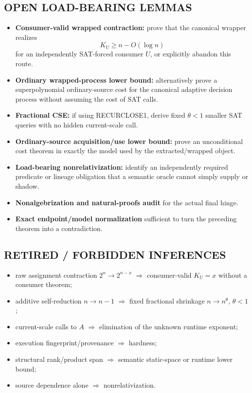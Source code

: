 \documentclass[11pt]{article}
\theoremstyle{plain}
\theoremstyle{definition}
\theoremstyle{remark}
\begin{document}
\subsection*{OPEN LOAD-BEARING LEMMAS}
\begin{itemize}
\item \textbf{Consumer-valid wrapped contraction:} prove that the canonical
wrapper realizes
\[
K_U\ge n-O(\log n)
\]
for an independently SAT-forced consumer \(U\), or explicitly abandon this
route.
\item \textbf{Ordinary wrapped-process lower bound:} alternatively prove a
superpolynomial ordinary-source cost for the canonical adaptive decision
process without assuming the cost of SAT calls.
\item \textbf{Fractional CSE:} if using RECURCLOSE1, derive fixed
\(\theta<1\) smaller SAT queries with no hidden current-scale call.
\item \textbf{Ordinary-source acquisition/use lower bound:} prove an
unconditional cost theorem in exactly the model used by the extracted/wrapped
object.
\item \textbf{Load-bearing nonrelativization:} identify an independently
required predicate or lineage obligation that a semantic oracle cannot simply
supply or shadow.
\item \textbf{Nonalgebrization and natural-proofs audit} for the actual final
hinge.
\item \textbf{Exact endpoint/model normalization} sufficient to turn the
preceding theorem into a contradiction.
\end{itemize}

\subsection*{RETIRED / FORBIDDEN INFERENCES}
\begin{itemize}
\item raw assignment contraction \(2^n\to2^{n-x}\) \(\Rightarrow\)
consumer-valid \(K_U=x\) without a consumer theorem;
\item additive self-reduction \(n\to n-1\) \(\Rightarrow\) fixed fractional
shrinkage \(n\to n^\theta\), \(\theta<1\);
\item current-scale calls to \(A\) \(\Rightarrow\) elimination of the unknown
runtime exponent;
\item execution fingerprint/provenance \(\Rightarrow\) hardness;
\item structural rank/product span \(\Rightarrow\) semantic static-space or
runtime lower bound;
\item source dependence alone \(\Rightarrow\) nonrelativization.
\end{itemize}
\end{document}
